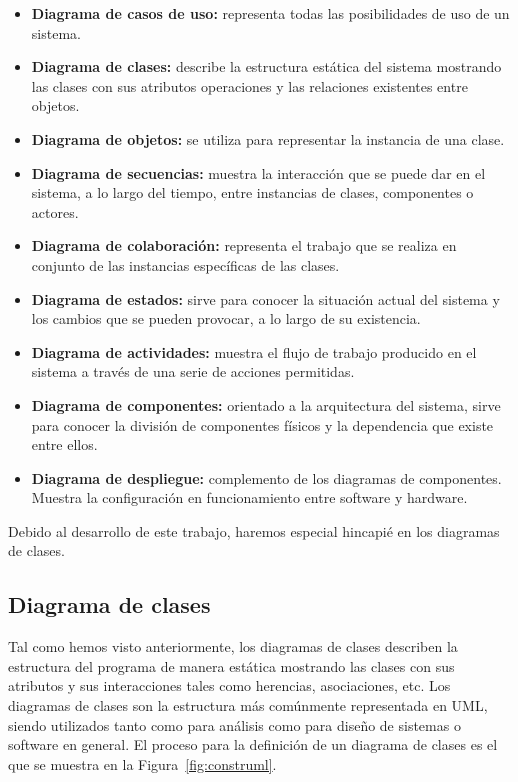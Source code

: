 \documentclass[a4paper, 12pt]{book}
\begin{document}
\begin{itemize}
  \item \textbf{Diagrama de casos de uso:} representa todas las posibilidades de uso de un sistema.
  \item \textbf{Diagrama de clases:} describe la estructura estática del sistema mostrando las clases con sus atributos
  operaciones y las relaciones existentes entre objetos.
  \item \textbf{Diagrama de objetos:} se utiliza para representar la instancia de una clase.
  \item \textbf{Diagrama de secuencias:} muestra la interacción que se puede dar en el sistema, a lo largo del tiempo, entre instancias de
  clases, componentes o actores.
  \item \textbf{Diagrama de colaboración:} representa el trabajo que se realiza en conjunto de las instancias específicas
  de las clases.
  \item \textbf{Diagrama de estados:} sirve para conocer la situación actual del sistema
  y los cambios que se pueden provocar, a lo largo de su existencia.
  \item \textbf{Diagrama de actividades:} muestra el flujo de trabajo producido en el sistema a través de una serie de acciones permitidas.
  \item \textbf{Diagrama de componentes:} orientado a la arquitectura del sistema, sirve para conocer la división
  de componentes físicos y la dependencia que existe entre ellos.
  \item \textbf{Diagrama de despliegue:} complemento de los diagramas de componentes. Muestra la configuración
  en funcionamiento entre software y hardware.
\end{itemize}

Debido al desarrollo de este trabajo, haremos especial hincapié en los diagramas de clases.

\subsection{Diagrama de clases}
\label{subsec:diagrama-de-clases}
Tal como hemos visto anteriormente, los diagramas de clases describen la estructura del programa de manera estática
mostrando las clases con sus atributos y sus interacciones tales como herencias, asociaciones, etc.
Los diagramas de clases son la estructura más comúnmente representada en UML, siendo utilizados
tanto como para análisis como para diseño de sistemas o software en general.
El proceso para la definición de un diagrama de clases es el que se muestra en la Figura~\ref{fig:construml}.
\end{document}
